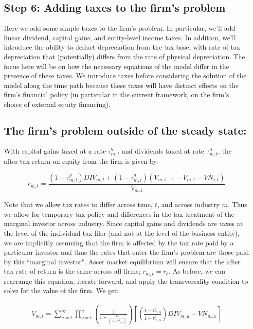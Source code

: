 \documentclass[letterpaper,12pt]{article}
\theoremstyle{definition}
\begin{document}
\begin{spacing}{1.5}
\section*{Step 6: Adding taxes to the firm's problem}

Here we add some simple taxes to the firm's problem.  In particular, we'll add linear dividend, capital gains, and entity-level income taxes.  In addition, we'll introduce the ability to deduct depreciation from the tax base, with rate of tax depreciation that (potentially) differs from the rate of physical depreciation.  The focus here will be on how the necessary equations of the model differ in the presence of these taxes.  We introduce taxes before considering the solution of the model along the time path because these taxes will have distinct effects on the firm's financial policy (in particular in the current framework, on the firm's choice of external equity financing).

\subsection*{The firm's problem outside of the steady state:}

With capital gains taxed at a rate $\tau^{g}_{m,t}$ and dividends taxed at rate $\tau^{d}_{m,t}$, the after-tax return on equity from the firm is given by:


\begin{equation}
r_{m,t} = \frac{(1-\tau^{d}_{m,t})DIV_{m,t}+(1-\tau^{g}_{m,t})(V_{m,t+1}-V_{m,t}-VN_{i,t})}{V_{m,t}}
\end{equation} 

Note that we allow tax rates to differ across time, $t$, and across industry $m$. Thus we allow for temporary tax policy and differences in the tax treatment of the marginal investor across industry.  Since capital gains and dividends are taxes at the level of the individual tax filer (and not at the level of the business entity), we are implicitly assuming that the firm is affected by the tax rate paid by a particular investor and thus the rates that enter the firm's problem are those paid by this ``marginal investor".  Asset market equilibrium will ensure that the after tax rate of return is the same across all firms; $r_{m,t}=r_{t}$. As before, we can rearrange this equation, iterate forward, and apply the transversality condition to solve for the value of the firm.  We get:

\begin{equation}
\label{eqn:v_firm_tax2}
\begin{split}
 V_{m,t}= \sum_{u=t}^{\infty} \prod_{\nu=t}^{u}\left(\frac{1}{1+\frac{r_{\nu}}{(1-\tau^{g}_{m,\nu})}}\right)\left[ \left(\frac{1-\tau^{d}_{m,u}}{1-\tau^{g}_{m,u}}\right)DIV_{m,u}-VN_{m,u} \right] \\
\end{split}
\end{equation}


\end{spacing}
\end{document}
